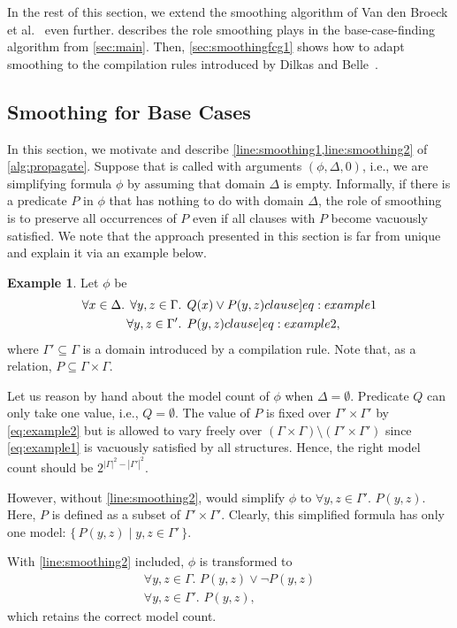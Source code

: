 \documentclass{article}
\theoremstyle{definition}
\newtheorem{example}{Example}
\begin{document}
In the rest of this section, we extend the smoothing algorithm of Van den Broeck
et al.~ even further.
 describes the role smoothing plays in the
base-case-finding algorithm from \cref{sec:main}. Then, \cref{sec:smoothingfcg1}
shows how to adapt smoothing to the compilation rules introduced by Dilkas and
Belle~.

\subsection{Smoothing for Base Cases}\label{sec:smoothingbase}

In this section, we motivate and describe \cref{line:smoothing1,line:smoothing2}
of \cref{alg:propagate}. Suppose that \Propagate is called with arguments
$(\phi, \Delta, 0)$, i.e., we are simplifying formula $\phi$ by assuming that
domain $\Delta$ is empty. Informally, if there is a predicate $P$ in $\phi$ that
has nothing to do with domain $\Delta$, the role of smoothing is to preserve all
occurrences of $P$ even if all clauses with $P$ become vacuously satisfied. We
note that the approach presented in this section is far from unique and explain
it via an example below.

\begin{example}\label{example:basecasesmoothing}
  Let $\phi$ be
  \begin{align}
    \forall x \in \Delta\text{. }\forall y, z \in \Gamma&\text{. }Q(x) \lor P(y, z)\label[clause]{eq:example1}\\
    \forall y, z \in \Gamma'&\text{. }P(y, z)\label[clause]{eq:example2},
  \end{align}
  where $\Gamma' \subseteq \Gamma$ is a domain introduced by a compilation rule.
  Note that, as a relation, $P \subseteq \Gamma \times \Gamma$.

  Let us reason by hand about the model count of $\phi$ when
  $\Delta = \emptyset$. Predicate $Q$ can only take one value, i.e.,
  $Q = \emptyset$. The value of $P$ is fixed over $\Gamma' \times \Gamma'$ by
  \cref{eq:example2} but is allowed to vary freely over
  $(\Gamma \times \Gamma) \setminus (\Gamma' \times \Gamma')$ since
  \cref{eq:example1} is vacuously satisfied by all structures. Hence, the right
  model count should be $2^{|\Gamma|^2 - |\Gamma'|^2}$.

  However, without \cref{line:smoothing2}, \Propagate would simplify $\phi$ to
  $\forall y, z \in \Gamma'\text{. }P(y, z)$. Here, $P$ is defined as a subset
  of $\Gamma' \times \Gamma'$. Clearly, this simplified formula has only one
  model: $\{\, P(y, z) \mid y, z \in \Gamma' \,\}$.

  With \cref{line:smoothing2} included, $\phi$ is transformed to
  \begin{gather*}
    \forall y, z \in \Gamma\text{. }P(y, z) \lor \neg P(y, z)\\
    \forall y, z \in \Gamma'\text{. }P(y, z),
  \end{gather*}
  which retains the correct model count.
\end{example}
\end{document}
